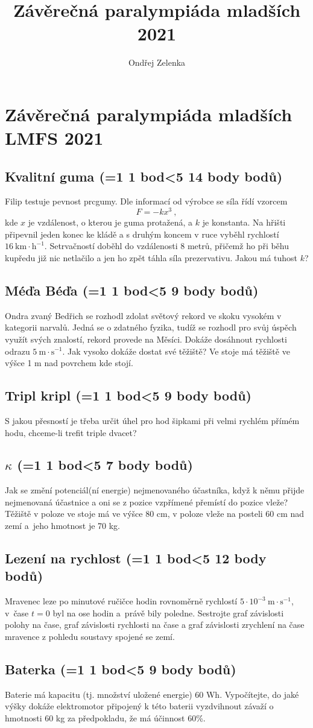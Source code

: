 \documentclass[10pt,a4paper,landscape,twocolumn]{article}
\author{Ondřej Zelenka}
\title{Závěrečná paralympiáda mladších 2021}
\newcounter{bodycounter}
\newcommand{\bodystring}[1]{\ifnum #1=1 1 bod\else\ifnum #1<5 #1 body\else #1 bodů\fi\fi}
\newcommand{\uloha}[3]{
\subsection{#1 (\bodystring{#2})}
#3\addtocounter{bodycounter}{#2}}
\begin{document}
\section*{Závěrečná paralympiáda mladších LMFS 2021}

\uloha{Kvalitní guma}{14}{
Filip testuje pevnost prcgumy. Dle informací od výrobce se síla řídí vzorcem
\begin{equation}
F = -kx^3 ~,
\end{equation}
kde $x$ je vzdálenost, o kterou je guma protažená, a $k$ je konstanta. Na hřišti připevnil jeden konec ke kládě a s druhým koncem v ruce vyběhl rychlostí $16~\mathrm{km\cdot h^{-1}}$. Setrvačností doběhl do vzdálenosti 8 metrů, přičemž ho při běhu kupředu již nic netlačilo a jen ho zpět táhla síla prezervativu. Jakou má tuhost $k$?
}


\uloha{Méďa Béďa}{9}{
Ondra zvaný Bedřich se rozhodl zdolat světový rekord ve skoku vysokém v kategorii narvalů. Jedná se o zdatného fyzika, tudíž se rozhodl pro svůj úspěch využít svých znalostí, rekord provede na Měsíci. Dokáže dosáhnout rychlosti odrazu $5~\mathrm{m\cdot s^{-1}}$. Jak vysoko dokáže dostat své těžiště? Ve stoje má těžiště ve výšce 1 m nad povrchem kde stojí.
}

\uloha{Tripl kripl}{9}{
S jakou přesností je třeba určit úhel pro hod šipkami při velmi rychlém přímém hodu, chceme-li trefit triple dvacet?
}

\uloha{$\kappa$}{7}{
Jak se změní potenciál(ní energie) nejmenovaného účastníka, když k němu přijde nejmenovaná účastnice a oni se z pozice vzpřímené přemístí do pozice vleže? Těžiště v poloze ve stoje má ve výšce 80 cm, v poloze vleže na posteli 60 cm nad zemí a~jeho hmotnost je 70 kg.
}

\uloha{Lezení na rychlost}{12}{
Mravenec leze po minutové ručičce hodin rovnoměrně rychlostí $5\cdot 10^{-3}~\mathrm{m\cdot s^{-1}}$, v~čase $t=0$ byl na ose hodin a~právě bily poledne. Sestrojte graf závislosti polohy na čase, graf závislosti rychlosti na čase a graf závislosti zrychlení na čase mravence z pohledu soustavy spojené se zemí.
}

\uloha{Baterka}{9}{
Baterie má kapacitu (tj. množství uložené energie) 60 Wh. Vypočítejte, do jaké výšky dokáže elektromotor připojený k této baterii vyzdvihnout závaží o hmotnosti 60 kg za předpokladu, že má účinnost 60\%.
}
\end{document}
